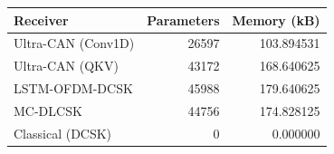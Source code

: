 \begin{tabular}{lrr}
\toprule
Receiver & Parameters & Memory (kB) \\
\midrule
Ultra-CAN (Conv1D) & 26597 & 103.894531 \\
Ultra-CAN (QKV) & 43172 & 168.640625 \\
LSTM-OFDM-DCSK & 45988 & 179.640625 \\
MC-DLCSK & 44756 & 174.828125 \\
Classical (DCSK) & 0 & 0.000000 \\
\bottomrule
\end{tabular}

